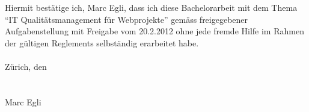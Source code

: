 Hiermit bestätige ich, Marc Egli, dass ich diese Bachelorarbeit mit dem Thema ``IT Qualitätsmanagement für Webprojekte'' gemäss freigegebener Aufgabenstellung mit Freigabe vom 20.2.2012 ohne jede fremde Hilfe im Rahmen der gültigen Reglements selbständig erarbeitet habe.\\
\\
Zürich, den \\
\\\\
Marc Egli
